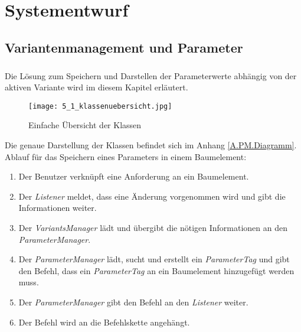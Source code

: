 \chapter{Systementwurf}\label{chp:systementwurf}


\section{Variantenmanagement und Parameter}
\paragraph{}

Die Lösung zum Speichern und Darstellen der Parameterwerte abhängig von der aktiven Variante wird im diesem Kapitel erläutert.\\

\begin{figure}[h!]
  \begin{center}
    \texttt{[image: 5\_1\_klassenuebersicht.jpg]}
  		  \caption{Einfache Übersicht der Klassen}
     \label{ttn.verbindung.klassen.loesung}
  \end{center}
\end{figure}


Die genaue Darstellung der Klassen befindet sich im Anhang  \ref{A.PM.Diagramm}. Ablauf für das Speichern eines Parameters in einem Baumelement:
\begin{enumerate}
\item Der Benutzer verknüpft eine Anforderung an ein Baumelement.
\item Der \textit{Listener} meldet, dass eine Änderung vorgenommen wird und gibt die Informationen weiter.
\item Der \textit{VariantsManager} lädt und übergibt die nötigen Informationen an den \textit{ParameterManager}.
\item Der \textit{ParameterManager} lädt, sucht und erstellt ein \textit{ParameterTag}  und gibt den Befehl, dass ein \textit{ParameterTag} an ein Baumelement hinzugefügt werden muss.
\item Der \textit{ParameterManager} gibt den Befehl an den \textit{Listener} weiter.
\item Der Befehl wird an die Befehlskette angehängt.
\end{enumerate}

